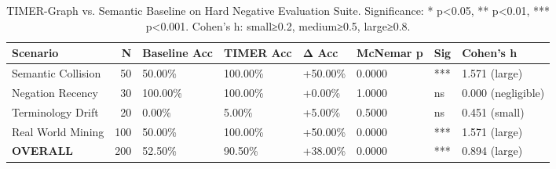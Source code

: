 \begin{table}
\caption{TIMER-Graph vs. Semantic Baseline on Hard Negative Evaluation Suite. Significance: * p<0.05, ** p<0.01, *** p<0.001. Cohen's h: small≥0.2, medium≥0.5, large≥0.8.}
\label{tab:timer_hard_negatives}
\begin{tabular}{lrllllll}
\toprule
Scenario & N & Baseline Acc & TIMER Acc & Δ Acc & McNemar p & Sig & Cohen's h \\
\midrule
Semantic Collision & 50 & 50.00\% & 100.00\% & +50.00\% & 0.0000 & *** & 1.571 (large) \\
Negation Recency & 30 & 100.00\% & 100.00\% & +0.00\% & 1.0000 & ns & 0.000 (negligible) \\
Terminology Drift & 20 & 0.00\% & 5.00\% & +5.00\% & 0.5000 & ns & 0.451 (small) \\
Real World Mining & 100 & 50.00\% & 100.00\% & +50.00\% & 0.0000 & *** & 1.571 (large) \\
\textbf{OVERALL} & 200 & 52.50\% & 90.50\% & +38.00\% & 0.0000 & *** & 0.894 (large) \\
\bottomrule
\end{tabular}
\end{table}
